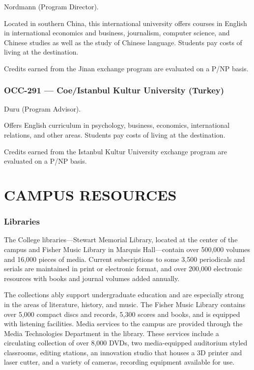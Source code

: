 \documentclass[
  letterpaper,
]{scrbook}
\renewcommand{\part}[1]{\addcontentsline{toc}{part}{#1}}
\begin{document}
Nordmann (Program Director).

Located in southern China, this international university offers courses
in English in international economics and business, journalism, computer
science, and Chinese studies as well as the study of Chinese language.
Students pay costs of living at the destination.

Credits earned from the Jinan exchange program are evaluated on a P/NP
basis.

\subsection{OCC-291 --- Coe/Istanbul Kultur University
(Turkey)}\label{occ-291-coeistanbul-kultur-university-turkey}

Duru (Program Advisor).

Offers English curriculum in psychology, business, economics,
international relations, and other areas. Students pay costs of living
at the destination.

Credits earned from the Istanbul Kultur University exchange program are
evaluated on a P/NP basis.

\part{CAMPUS RESOURCES}

\chapter{CAMPUS RESOURCES}\label{campus-resources-1}

\subsection{Libraries}\label{libraries}

The College libraries---Stewart Memorial Library, located at the center
of the campus and Fisher Music Library in Marquis Hall---contain over
500,000 volumes and 16,000 pieces of media. Current subscriptions to
some 3,500 periodicals and serials are maintained in print or electronic
format, and over 200,000 electronic resources with books and journal
volumes added annually.

The collections ably support undergraduate education and are especially
strong in the areas of literature, history, and music. The Fisher Music
Library contains over 5,000 compact discs and records, 5,300 scores and
books, and is equipped with listening facilities. Media services to the
campus are provided through the Media Technologies Department in the
library. These services include a circulating collection of over 8,000
DVDs, two media-equipped auditorium styled classrooms, editing stations,
an innovation studio that houses a 3D printer and laser cutter, and a
variety of cameras, recording equipment available for use.
\end{document}
